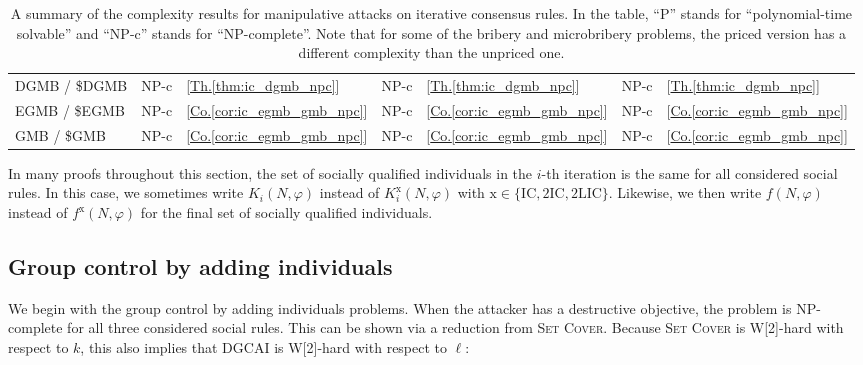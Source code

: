 \documentclass[
    12pt,               %
    a4paper,            %
    bibtotoc,           %
    pointlessnumbers,   %
    ngerman,            %
    titlepage,          %
    leqno,              %
    ]{scrarticle}       %
\newcommand\ttref[1]{[\hyperref[#1]{Th.\thinspace\ref*{#1}}]}
\newcommand\ccref[1]{[\hyperref[#1]{Co.\thinspace\ref*{#1}}]}
\begin{document}
\begin{table}[!htb]
\begin{tabularx}{\textwidth}{
p{}
p{}
X
p{}
X
p{}
X
}
DGMB / \$DGMB &
NP-c                            & \ttref{thm:ic_dgmb_npc} &
NP-c                            & \ttref{thm:ic_dgmb_npc} &
NP-c                            & \ttref{thm:ic_dgmb_npc} \\

EGMB / \$EGMB &
NP-c                            & \ccref{cor:ic_egmb_gmb_npc} &
NP-c                            & \ccref{cor:ic_egmb_gmb_npc} &
NP-c                            & \ccref{cor:ic_egmb_gmb_npc} \\

GMB / \$GMB &
NP-c                            & \ccref{cor:ic_egmb_gmb_npc} &
NP-c                            & \ccref{cor:ic_egmb_gmb_npc} &
NP-c                            & \ccref{cor:ic_egmb_gmb_npc} \\

\hline
\end{tabularx}
\caption{
A summary of the complexity results for manipulative attacks on iterative consensus rules.
In the table, ``P'' stands for ``polynomial-time solvable'' and ``NP-c'' stands for ``NP-complete''.
Note that for some of the bribery and microbribery problems, the priced version has a different complexity than the unpriced one.
}
\label{tab:manipulative_attacks_iterative_consensus}
\end{table}

\renewcommand{\arraystretch}{1.0}



In many proofs throughout this section, the set of socially qualified individuals in the $i$-th iteration is the same for all considered social rules. In this case, we sometimes write $K_i(N, \varphi)$ instead of $K^{\text{x}}_i(N, \varphi)$ with $\text{x} \in \{ \text{IC}, \text{2IC}, \text{2LIC} \}$. Likewise, we then write $f(N, \varphi)$ instead of $f^{\text{x}}(N, \varphi)$ for the final set of socially qualified individuals.



\subsection{Group control by adding individuals}

We begin with the group control by adding individuals problems. When the attacker has a destructive objective, the problem is NP-complete for all three considered social rules. This can be shown via a reduction from \textsc{Set Cover}. Because \textsc{Set Cover} is W[2]-hard with respect to $k$, this also implies that DGCAI is W[2]-hard with respect to $\ell$:
\end{document}
